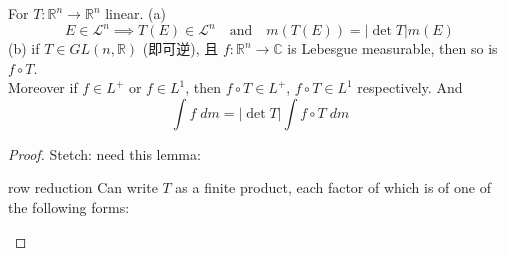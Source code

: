 \documentclass[lang=cn,11pt]{elegantbook}
\begin{document}
\begin{theorem}
For $T: \mathbb{R}^n \to \mathbb{R}^n$ linear. 
(a) \[ E \in \mathcal{L}^n  \implies T(E) \in \mathcal{L}^n  \quad \text{and}\quad    m(T(E)) = |\det T| m(E)  \]
(b) if $T \in GL(n,\mathbb{R})$ (即可逆), 且 $f: \mathbb{R}^n \to \mathbb{C}$ is Lebesgue measurable, then so is $f \circ T$.\\
Moreover if $f \in L^+$ or $f \in L^1$, then $f \circ T \in L^+$, $f \circ T \in L^1$ respectively. And \[
  \int f \; dm = |\det T| \int f \circ T \; dm
\]
\end{theorem}

\begin{proof}
    Stetch: need this lemma: \begin{lemma}{row reduction}
        Can write $T$ as a finite product, each factor of which is of one of the following forms: 
    \end{lemma}
\end{proof}
\end{document}
